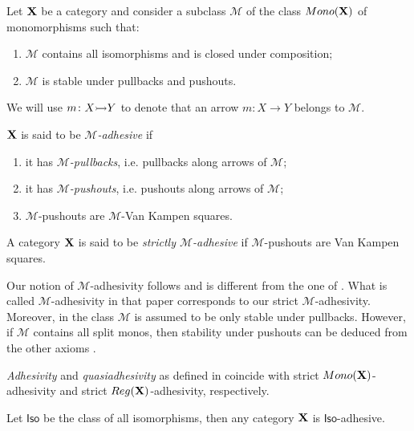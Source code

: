 \documentclass[a4paper,UKenglish,cleveref,pdftex, thm-restate,numberwithinsect]{lipics}
\newcommand{\mon}{\mathsf{Mono}}
\newcommand{\reg}{\mathsf{Reg}}
\newcommand{\mto}[0]{\scalebox{1}{$\rightarrowtail$}}
\def\X{\textbf {\textup{X}}}
\begin{document}
\begin{definition}
	Let $\X$ be a category and consider a subclass $\mathcal{M}$ of the class $\mon(\X)$ of monomorphisms such that:
	\begin{enumerate}
		\item $\mathcal{M}$ contains all isomorphisms and is closed under composition;
		\item $\mathcal{M}$ is stable under pullbacks and pushouts.
	\end{enumerate} 
	We will use $m\colon X\mto Y$ to denote that an arrow $m\colon X\to Y$ belongs to $\mathcal{M}$. 
	
	$\X$ is said to be \emph{$\mathcal{M}$-adhesive} if
	\begin{enumerate}
		\item it has \emph{$\mathcal{M}$-pullbacks}, i.e. pullbacks along arrows of $\mathcal{M}$;
		\item it has \emph{$\mathcal{M}$-pushouts}, i.e. pushouts along arrows of $\mathcal{M}$;
		\item  $\mathcal{M}$-pushouts are $\mathcal{M}$-Van Kampen squares.
	\end{enumerate}
		
A category $\X$ is said to be \emph{strictly $\mathcal{M}$-adhesive} if $\mathcal{M}$-pushouts are Van Kampen squares.	
\end{definition}

\begin{remark}\label{rem:diff}Our notion of $\mathcal{M}$-adhesivity follows \cite{ehrig2012,ehrig2014adhesive} and is different from the one of \cite{azzi2019essence}. What is called $\mathcal{M}$-adhesivity in that paper corresponds to our strict $\mathcal{M}$-adhesivity. Moreover, in \cite{azzi2019essence} the class $\mathcal{M}$ is assumed to be only stable under pullbacks. However, if $\mathcal{M}$ contains all split monos, then stability under pushouts can be deduced from the other axioms \cite[Prop.~$5.1.21$]{castelnovo2023thesis}.
\end{remark}


\begin{remark}\label{rem:salva} 
	\emph{Adhesivity} and \emph{quasiadhesivity} as defined in \cite{lack2005adhesive,garner2012axioms}  coincide with  strict $\mon(\X) $-adhesivity and strict $\reg(\X)$-adhesivity, respectively. 
\end{remark}

\begin{example}\label{rem:iso} Let $\mathsf{Iso}$ be the class of all isomorphisms, then any category $\X$ is $\mathsf{Iso}$-adhesive.
\end{example}
\end{document}

